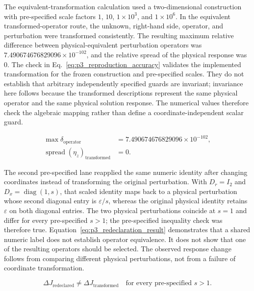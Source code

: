 \documentclass[preprint,12pt]{elsarticle}
\theoremstyle{definition}
\begin{document}
The equivalent-transformation calculation used a two-dimensional construction with pre-specified scale factors $1$, $10$, $1\allowbreak\times10^{3}$, and $1\allowbreak\times10^{6}$. In the equivalent transformed-operator route, the unknown, right-hand side, operator, and perturbation were transformed consistently. The resulting maximum relative difference between physical-equivalent perturbation operators was $7.490674676829096\allowbreak\times10^{-102}$, and the relative spread of the physical response was $0$. The check in Eq.~\eqref{eq:p3_reproduction_accuracy} validates the implemented transformation for the frozen construction and pre-specified scales. They do not establish that arbitrary independently specified guards are invariant; invariance here follows because the transformed descriptions represent the same physical operator and the same physical solution response. The numerical values therefore check the algebraic mapping rather than define a coordinate-independent scalar guard.

\begin{linenomath*}
\begin{equation}
\begin{aligned}
\max \delta_{\mathrm{operator}} &= 7.490674676829096\times10^{-102},\\
\operatorname{spread}(\eta_z)_{\mathrm{transformed}} &= 0.
\end{aligned}
\label{eq:p3_reproduction_accuracy}
\end{equation}
\end{linenomath*}

The second pre-specified lane reapplied the same numeric identity after changing coordinates instead of transforming the original perturbation. With $D_r=I_2$ and $D_x=\operatorname{diag}(1,s)$, that scaled identity maps back to a physical perturbation whose second diagonal entry is $\varepsilon/s$, whereas the original physical identity retains $\varepsilon$ on both diagonal entries. The two physical perturbations coincide at $s=1$ and differ for every pre-specified $s>1$; the pre-specified inequality check was therefore true. Equation~\eqref{eq:p3_redeclaration_result} demonstrates that a shared numeric label does not establish operator equivalence. It does not show that one of the resulting operators should be selected. The observed response change follows from comparing different physical perturbations, not from a failure of coordinate transformation.

\begin{linenomath*}
\begin{equation}
\Delta J_{\mathrm{redeclared}}\neq
\Delta J_{\mathrm{transformed}}\quad\text{for every pre-specified }s>1.
\label{eq:p3_redeclaration_result}
\end{equation}
\end{linenomath*}
\end{document}
